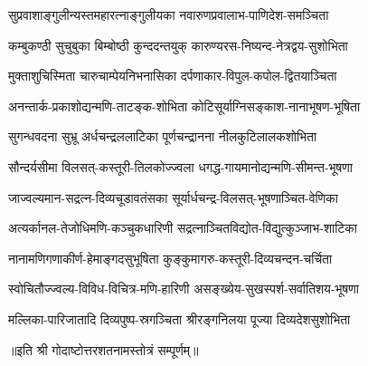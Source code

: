 \twolineshloka
{सुप्रवाशाङ्गुलीन्यस्तमहारत्नाङ्गुलीयका}
{नवारुणप्रवालाभ-पाणिदेश-समञ्चिता}%

\twolineshloka
{कम्बुकण्ठी  सुचुबुका  बिम्बोष्ठी  कुन्ददन्तयुक्}
{कारुण्यरस-निष्यन्द-नेत्रद्वय-सुशोभिता}%


\twolineshloka
{मुक्ताशुचिस्मिता  चारुचाम्पेयनिभनासिका}
{दर्पणाकार-विपुल-कपोल-द्वितयाञ्चिता}%


\twolineshloka
{अनन्तार्क-प्रकाशोद्यन्मणि-ताटङ्क-शोभिता}
{कोटिसूर्याग्निसङ्काश-नानाभूषण-भूषिता}%


\twolineshloka
{सुगन्धवदना  सुभ्रू  अर्धचन्द्रललाटिका}
{पूर्णचन्द्रानना  नीलकुटिलालकशोभिता}%


\twolineshloka
{सौन्दर्यसीमा  विलसत्-कस्तूरी-तिलकोज्ज्वला}
{धगद्ध-गायमानोद्यन्मणि-सीमन्त-भूषणा}%


\twolineshloka
{जाज्वल्यमान-सद्रत्न-दिव्यचूडावतंसका}
{सूर्यार्धचन्द्र-विलसत्-भूषणाञ्चित-वेणिका}%


\twolineshloka
{अत्यर्कानल-तेजोधिमणि-कञ्चुकधारिणी}
{सद्रत्नाञ्चितविद्योत-विद्युत्कुञ्जाभ-शाटिका}%

\twolineshloka
{नानामणिगणाकीर्ण-हेमाङ्गदसुभूषिता}
{कुङ्कुमागरु-कस्तूरी-दिव्यचन्दन-चर्चिता}%

\twolineshloka
{स्वोचितौज्ज्वल्य-विविध-विचित्र-मणि-हारिणी}
{असङ्ख्येय-सुखस्पर्श-सर्वातिशय-भूषणा}%

\twolineshloka
{मल्लिका-पारिजातादि  दिव्यपुष्प-स्रगञ्चिता}
{श्रीरङ्गनिलया  पूज्या  दिव्यदेशसुशोभिता}%

{॥इति श्री गोदाष्टोत्तरशतनामस्तोत्रं सम्पूर्णम्॥}